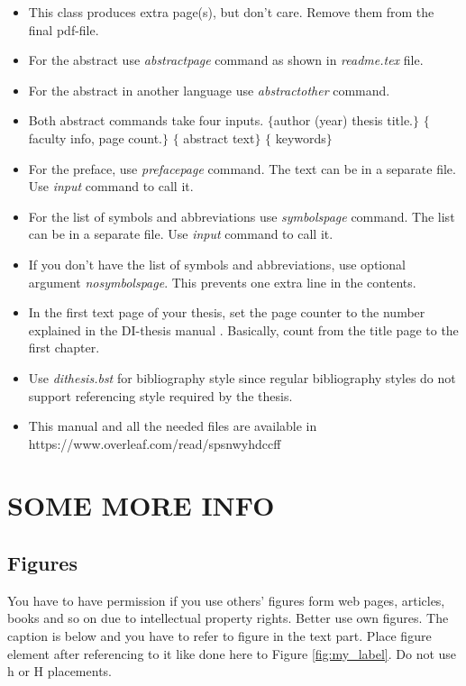 \documentclass[]{dithesis}
\begin{document}
\begin{itemize}
\item This class produces extra page(s), but don't care. Remove them from the final pdf-file.
\item For the abstract use \emph{abstractpage} command as shown in \emph{readme.tex} file. 
\item For the abstract in another language use \emph{abstractother} command.
\item Both abstract commands take four inputs. $\{$author (year) thesis title.$\}$ $\{$faculty info, page count.$\}$ $\{$ abstract text$\}$ $\{$ keywords$\}$
\item For the preface, use \emph{prefacepage} command. The text can be in a separate file. Use \emph{input} command to call it.
\item For the list of symbols and abbreviations use \emph{symbolspage} command. The list can be in a separate file. Use \emph{input} command to call it.
\item If you don't have the list of symbols and abbreviations, use optional argument \emph{nosymbolspage}. This prevents one extra line in the contents.
\item In the first text page of your thesis, set the page counter to the number explained in the DI-thesis manual \cite{dithe}. Basically, count from the title page to the first chapter.
\item Use \emph{dithesis.bst} for bibliography style since regular \LaTeXe bibliography styles do not support referencing style required by the thesis.
\item This manual and all the needed files are available in\\ https://www.overleaf.com/read/spsnwyhdccff
 
\end{itemize}

\chapter{SOME MORE INFO}
\section{Figures}
You have to have permission if you use others' figures form web pages, articles, books and so on due to intellectual property rights. Better use own figures. The caption is below and you have to refer to figure in the text part. Place figure element after referencing to it like done here to Figure \ref{fig:my_label}. Do not use h or H placements.
\end{document}

